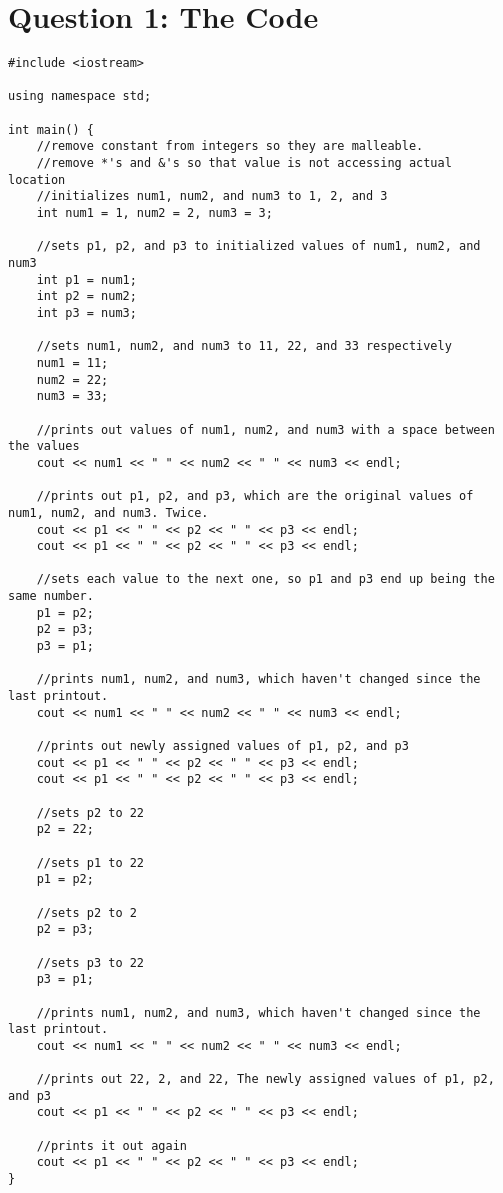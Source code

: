 \documentclass[11pt]{article}
\begin{document}
\section*{Question 1: The Code}
\begin{lstlisting}
#include <iostream>

using namespace std;

int main() {
    //remove constant from integers so they are malleable.
    //remove *'s and &'s so that value is not accessing actual location
    //initializes num1, num2, and num3 to 1, 2, and 3
    int num1 = 1, num2 = 2, num3 = 3;

    //sets p1, p2, and p3 to initialized values of num1, num2, and num3
    int p1 = num1;
    int p2 = num2;
    int p3 = num3;

    //sets num1, num2, and num3 to 11, 22, and 33 respectively
    num1 = 11;
    num2 = 22;
    num3 = 33;

    //prints out values of num1, num2, and num3 with a space between the values
    cout << num1 << " " << num2 << " " << num3 << endl;

    //prints out p1, p2, and p3, which are the original values of num1, num2, and num3. Twice.
    cout << p1 << " " << p2 << " " << p3 << endl;
    cout << p1 << " " << p2 << " " << p3 << endl;

    //sets each value to the next one, so p1 and p3 end up being the same number.
    p1 = p2;
    p2 = p3;
    p3 = p1;

    //prints num1, num2, and num3, which haven't changed since the last printout.
    cout << num1 << " " << num2 << " " << num3 << endl;

    //prints out newly assigned values of p1, p2, and p3
    cout << p1 << " " << p2 << " " << p3 << endl;
    cout << p1 << " " << p2 << " " << p3 << endl;

    //sets p2 to 22
    p2 = 22;

    //sets p1 to 22
    p1 = p2;

    //sets p2 to 2
    p2 = p3;

    //sets p3 to 22
    p3 = p1;

    //prints num1, num2, and num3, which haven't changed since the last printout.
    cout << num1 << " " << num2 << " " << num3 << endl;

    //prints out 22, 2, and 22, The newly assigned values of p1, p2, and p3
    cout << p1 << " " << p2 << " " << p3 << endl;

    //prints it out again
    cout << p1 << " " << p2 << " " << p3 << endl;
}
\end{lstlisting}
\end{document}
